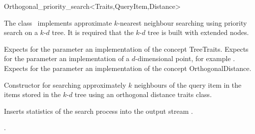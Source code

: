 

\begin{ccRefClass}{Orthogonal_priority_search<Traits,QueryItem,Distance>}  %


\ccDefinition

The class \ccRefName\ implements approximate $k$-nearest neighbour searching
using priority search on a $k$-$d$ tree. It is required that the $k$-$d$ tree is
built with extended nodes.


\ccParameters

Expects for the parameter  an implementation of the concept TreeTraits.
Expects for the parameter   an implementation
of a $d$-dimensional point, for example .
Expects for the parameter  an implementation of the concept OrthogonalDistance.

\ccTypes



\ccCreation
{}  %

{Constructor for searching approximately $k$ neighbours of the query item 
in the items stored in the $k$-$d$ tree  using an orthogonal distance
traits class.}




{
Inserts statistics of the search process into the output stream .
}

\ccSeeAlso

.

\end{ccRefClass}


